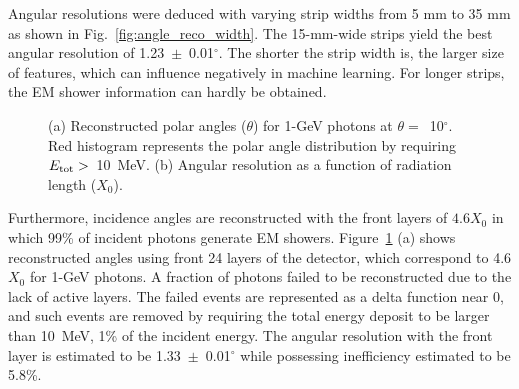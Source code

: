\documentclass[preprint,12pt,times,a4paper]{elsarticle}
\begin{document}
Angular resolutions were deduced with varying strip widths from 5 mm to 35 mm as shown in Fig.~\ref{fig:angle_reco_width}. The 15-mm-wide strips yield the best angular resolution of 1.23~$\pm$~0.01$^{\circ}$. The shorter the strip width is, the larger size of features, which can influence negatively in machine learning. For longer strips, the EM shower information can hardly be obtained.

\begin{figure}[!hbt]
\centering
{}
\caption{ (a) Reconstructed polar angles ($\theta$) for 1-GeV photons at $\theta=$~10$^{\circ}$. Red histogram represents the polar angle distribution by requiring $E_{\rm{tot}}>$~10~MeV. (b) Angular resolution as a function of radiation length ($X_{0}$).}
\label{fig:angle_reco_layer}
\end{figure}

Furthermore, incidence angles are reconstructed with the front layers of $4.6X_{0}$ in which 99\% of incident photons generate EM showers. Figure~\ref{fig:angle_reco_layer} (a) shows reconstructed angles using front 24 layers of the detector, which correspond to 4.6$X_{0}$ for 1-GeV photons. A fraction of photons failed to be reconstructed due to the lack of active layers. The failed events are represented as a delta function near 0, and such events are removed by requiring the total energy deposit to be larger than 10~MeV, 1\% of the incident energy. The angular resolution with the front layer is estimated to be 1.33~$\pm$~0.01$^{\circ}$ while possessing inefficiency estimated to be 5.8\%.
\end{document}
